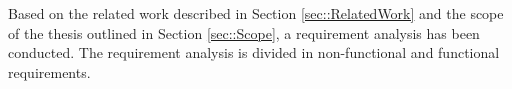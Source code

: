 Based on the related work described in Section \ref{sec::RelatedWork} and the scope of the thesis outlined in Section \ref{sec::Scope}, a requirement analysis has been conducted.
The requirement analysis is divided in non-functional and functional requirements.
